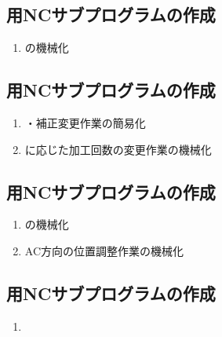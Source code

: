 \subsection{\OutcutMilling 用NCサブプログラムの作成\TBW}
\begin{enumerate}[label=\sarrow]
\item \CurvedOutcutMilling の機械化
\end{enumerate}


\subsection{\KeywayMilling 用NCサブプログラムの作成\TBW}
\begin{enumerate}[label=\sarrow]
\item \KeywayPos・\KeywayWidth 補正変更作業の簡易化
\item \KeywayWidth に応じた加工回数の変更作業の機械化
\end{enumerate}


\subsection{\EndFaceChamferMilling 用NCサブプログラムの作成\TBW}
\begin{enumerate}[label=\sarrow]
\item \EndFaceChamferMilling の機械化
\item AC方向の位置調整作業の機械化
\end{enumerate}


\subsection{\Dimple 用NCサブプログラムの作成\TBW}
\begin{enumerate}[label=\sarrow]
\item
\end{enumerate}



